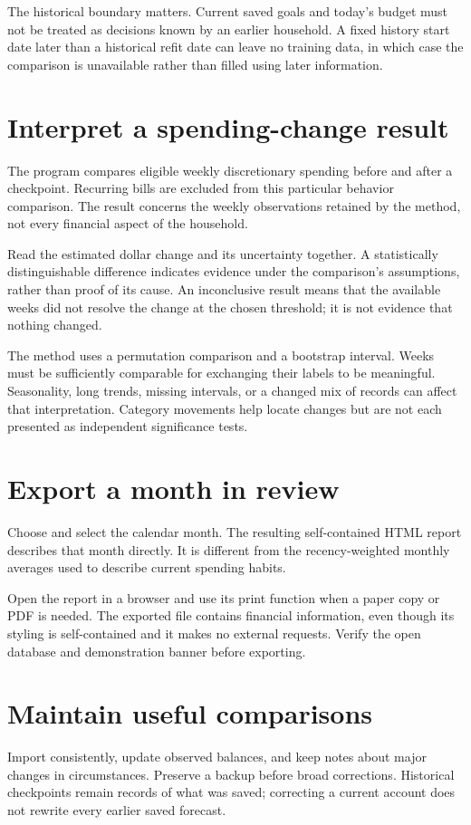 The historical boundary matters. Current saved goals and today's budget must not be treated as decisions known by an earlier household. A fixed history start date later than a historical refit date can leave no training data, in which case the comparison is unavailable rather than filled using later information.

\section{Interpret a spending-change result}
The program compares eligible weekly discretionary spending before and after a checkpoint. Recurring bills are excluded from this particular behavior comparison. The result concerns the weekly observations retained by the method, not every financial aspect of the household.

Read the estimated dollar change and its uncertainty together. A statistically distinguishable difference indicates evidence under the comparison's assumptions, rather than proof of its cause. An inconclusive result means that the available weeks did not resolve the change at the chosen threshold; it is not evidence that nothing changed.

The method uses a permutation comparison and a bootstrap interval. Weeks must be sufficiently comparable for exchanging their labels to be meaningful. Seasonality, long trends, missing intervals, or a changed mix of records can affect that interpretation. Category movements help locate changes but are not each presented as independent significance tests.

\section{Export a month in review}
Choose  and select the calendar month. The resulting self-contained HTML report describes that month directly. It is different from the recency-weighted monthly averages used to describe current spending habits.

Open the report in a browser and use its print function when a paper copy or PDF is needed. The exported file contains financial information, even though its styling is self-contained and it makes no external requests. Verify the open database and demonstration banner before exporting.

\section{Maintain useful comparisons}
Import consistently, update observed balances, and keep notes about major changes in circumstances. Preserve a backup before broad corrections. Historical checkpoints remain records of what was saved; correcting a current account does not rewrite every earlier saved forecast.

